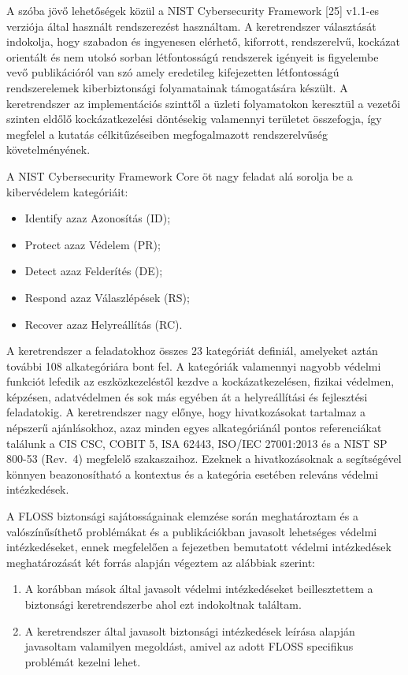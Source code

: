 \documentclass[12pt,magyar,a4paper,oneside]{scrreprt}
\providecommand{\tightlist}{%
  \setlength{\itemsep}{0pt}\setlength{\parskip}{0pt}}
\begin{document}
A szóba jövő lehetőségek közül a NIST Cybersecurity Framework {[}25{]}
v1.1-es verziója által használt rendszerezést használtam. A
keretrendszer választását indokolja, hogy szabadon és ingyenesen
elérhető, kiforrott, rendszerelvű, kockázat orientált és nem utolsó
sorban létfontosságú rendszerek igényeit is figyelembe vevő
publikációról van szó amely eredetileg kifejezetten létfontosságú
rendszerelemek kiberbiztonsági folyamatainak támogatására készült. A
keretrendszer az implementációs szinttől a üzleti folyamatokon keresztül
a vezetői szinten eldőlő kockázatkezelési döntésekig valamennyi
területet összefogja, így megfelel a kutatás célkitűzéseiben
megfogalmazott rendszerelvűség követelményének.

A NIST Cybersecurity Framework Core öt nagy feladat alá sorolja be a
kibervédelem kategóriáit:

\begin{itemize}
\tightlist
\item
  Identify azaz Azonosítás (ID);
\item
  Protect azaz Védelem (PR);
\item
  Detect azaz Felderítés (DE);
\item
  Respond azaz Válaszlépések (RS);
\item
  Recover azaz Helyreállítás (RC).
\end{itemize}

A keretrendszer a feladatokhoz összes 23 kategóriát definiál, amelyeket
aztán további 108 alkategóriára bont fel. A kategóriák valamennyi
nagyobb védelmi funkciót lefedik az eszközkezeléstől kezdve a
kockázatkezelésen, fizikai védelmen, képzésen, adatvédelmen és sok más
egyében át a helyreállítási és fejlesztési feladatokig. A keretrendszer
nagy előnye, hogy hivatkozásokat tartalmaz a népszerű ajánlásokhoz, azaz
minden egyes alkategóriánál pontos referenciákat találunk a CIS CSC,
COBIT 5, ISA 62443, ISO/IEC 27001:2013 és a NIST SP 800-53 (Rev.~4)
megfelelő szakaszaihoz. Ezeknek a hivatkozásoknak a segítségével könnyen
beazonosítható a kontextus és a kategória esetében releváns védelmi
intézkedések.

A FLOSS biztonsági sajátosságainak elemzése során meghatároztam és a
valószínűsíthető problémákat és a publikációkban javasolt lehetséges
védelmi intézkedéseket, ennek megfelelően a fejezetben bemutatott
védelmi intézkedések meghatározását két forrás alapján végeztem az
alábbiak szerint:

\begin{enumerate}
\def\labelenumi{\arabic{enumi}.}
\tightlist
\item
  A korábban mások által javasolt védelmi intézkedéseket beillesztettem
  a biztonsági keretrendszerbe ahol ezt indokoltnak találtam.
\item
  A keretrendszer által javasolt biztonsági intézkedések leírása alapján
  javasoltam valamilyen megoldást, amivel az adott FLOSS specifikus
  problémát kezelni lehet.
\end{enumerate}
\end{document}
